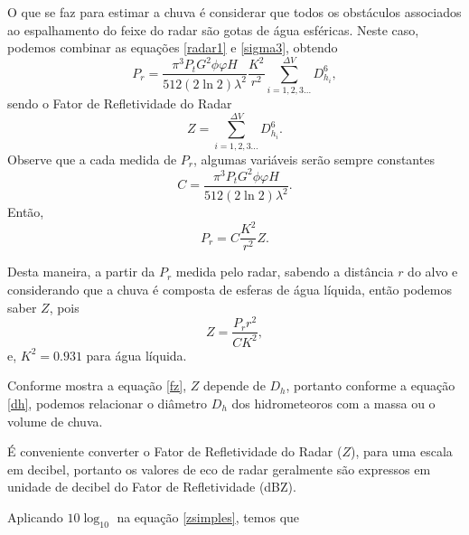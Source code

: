 O que se faz para estimar a chuva é considerar que todos os obstáculos associados ao espalhamento do feixe do radar são gotas de água esféricas. Neste caso, podemos combinar as equações \ref{radar1} e \ref{sigma3}, obtendo
\begin{equation}
P_r = \dfrac{\pi^3 P_t G^2  \phi \varphi H }{ 512 (2\ln2) \lambda^2 } \dfrac{ K^2  }{ r^2 }  \sum_{i=1, 2, 3 ... }^{\Delta V}  D_{h_i}^6, 
\end{equation} 
sendo o Fator de Refletividade do Radar
\begin{equation}
Z =  \sum_{i=1, 2, 3 ... }^{\Delta V}  D_{h_i}^6.
\label{fz}
\end{equation}
Observe que a cada medida de $P_r$, algumas variáveis serão sempre constantes 
\begin{equation}
C = \dfrac{\pi^3 P_t G^2  \phi \varphi H }{ 512 (2\ln2) \lambda^2 } .
\end{equation}
Então,
\begin{equation}
P_r = C \dfrac{K^2}{r^2}  Z.
\end{equation}

Desta maneira, a partir da $P_r$ medida pelo radar, sabendo a distância $r$ do alvo e considerando que a chuva é composta de esferas de água líquida, então podemos saber $Z$, pois 
\begin{equation}
Z = \dfrac{P_r r^2}{C K^2},
\label{zsimples}
\end{equation}
e, $K^2=0.931$ para água líquida.


Conforme mostra a equação \ref{fz}, $Z$ depende de $D_h$, portanto conforme a equação \ref{dh}, podemos relacionar o diâmetro $D_h$ dos hidrometeoros com a massa ou o volume de chuva.  

É conveniente converter o Fator de Refletividade do Radar ($Z$), para uma escala em decibel, portanto os valores de eco de radar geralmente são expressos em unidade de decibel do Fator de Refletividade (dBZ). 

Aplicando $10\log_{10}$ na equação \ref{zsimples}, temos que

